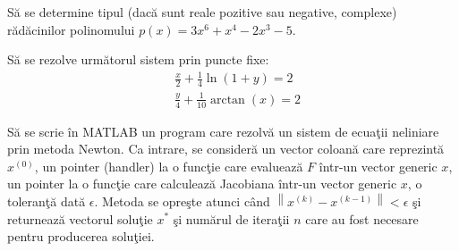 \documentclass{exam}
\begin{document}
\begin{questions}

	\question Să se determine tipul (dacă sunt reale pozitive sau negative,
	complexe) rădăcinilor polinomului $p(x)=3x^{6}+x^{4}-2x^{3}-5$.

	\question Să se rezolve următorul sistem prin puncte fixe:
	\begin{align*}
		 & \frac{x}{2} + \frac{1}{4}\ln(1 + y)   = 2 \\
		 & \frac{y}{4} + \frac{1}{10}\arctan(x)  = 2
	\end{align*}

	\question Să se scrie în MATLAB un program care rezolvă un sistem de ecuaţii
	neliniare prin metoda Newton. Ca intrare, se consideră un vector coloană care
	reprezintă $x^{(0)}$, un pointer (handler) la o funcţie care evaluează $F$
	într-un vector generic $x$, un pointer la o funcţie care calculează Jacobiana
	într-un vector generic $x$, o toleranţă dată $\epsilon$. Metoda se opreşte
	atunci când  $\left \| x^{(k)}-x^{(k-1)} \right \|< \epsilon$ şi returnează
	vectorul soluţie $x^{*}$ şi numărul de iteraţii $n$ care au fost necesare pentru
	producerea soluţiei.

\end{questions}



\end{document}
